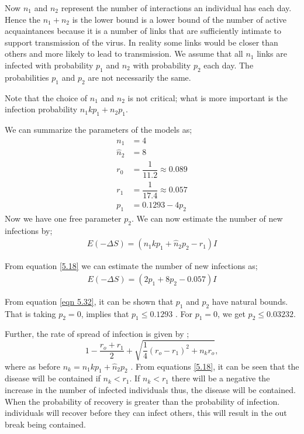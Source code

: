 Now $n_1$ and $n_2$ represent the number of interactions an individual has each day. Hence the  $n_1 + n_2$ is the lower bound is a lower bound of the number of active acquaintances because it is a number of links that are sufficiently intimate to support transmission of the virus. In reality some links would be closer than others and more likely to lead to transmission. We assume that all $n_1$ links are infected with probability $p_1$ and $n_2$ with probability $p_2$ each day. The probabilities $p_1$ and $p_2$ are not necessarily  the same.

Note that the choice of $n_1$ and $n_2$ is not critical; what is more important is the infection probability $n_1kp_1 + n_2p_1$.

We can summarize the parameters of the models as;
\begin{align}
n_1 &= 4 \\
\widehat{n}_2 &= 8 \\
r_0 &= \dfrac{1}{11.2} \approx 0.089 \\
r_1 &= \dfrac{1}{17.4} \approx 0.057 \\
p_1 &= 0.1293 - 4 p_2 \label{eqn 5.1.7}
\end{align}
Now we have one free parameter $p_2$. We can now estimate the number of new infections by;
\begin{align}
E(- \Delta S) = (n_1 k p_1 + \widehat{n}_2    p_2 - r_1) I \label{5.18}
\end{align}

 From equation \ref{5.18} we can estimate the number of new infections as;
\begin{align}
E(- \Delta S) = (2 p_1 + 8 p_2 - 0.057) I  \label{5.1.9}
\end{align}
 
From equation \ref{eqn 5.32}, it can be shown that $p_1$ and $p_2$ have natural bounds. That is taking $p_2 = 0$, implies that $p_1 \leq 0.1293$ . For $p_1 = 0$, we get $p_2 \leq 0.03232$.

Further, the rate of spread of infection is given by ;
\begin{equation}
1- \dfrac{r_o + r_1}{2} + \sqrt{\dfrac{1}{4}(r_o - r_1)^2 + n_k r_o} \label{eqn 5.3.10},
\end{equation}
where as before $n_k = n_1kp_1 + \widehat{n}_2 p_2$ \citep{fu2013propagation}.
From equations \ref{5.18}, it can be seen that the disease will be contained if $n_k < r_1$. If $n_k < r_1$ there will be a negative the increase in the number of infected individuals thus, the disease will be contained. When the probability of recovery is greater than the probability of infection. individuals will recover before they can infect others, this will result in the out break being contained.

